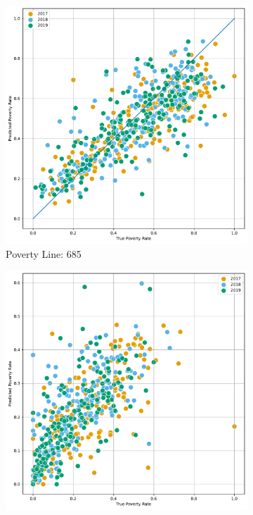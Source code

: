 \begin{figure}[H]
    \caption{Correlation: Predicted Poverty against true by Province}
    \centering
         \centering
         \begin{subfigure}[b]{0.47\textwidth}
             \centering
             \includegraphics[width=\textwidth]{../figures/fig4_3_prediction_vs_true_poverty_rate_provincia_p685_scatter.pdf}
             \caption{Poverty Line: 685}
         \end{subfigure}
         \hfill
         \begin{subfigure}[b]{0.47\textwidth}
             \centering
             \includegraphics[width=\textwidth]{../figures/fig4_2_prediction_vs_true_poverty_rate_provincia_p365_scatter.pdf}

\end{subfigure}
\end{figure}
